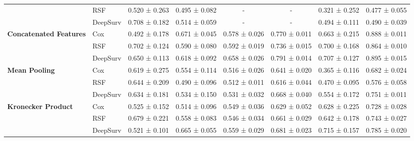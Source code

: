 \begin{sidewaystable}[htbp]
\begin{tabular}{@{}llcccccc@{}}
        & RSF & 0.520 ± 0.263 & 0.495 ± 0.082 & - & - & 0.321 ± 0.252 & 0.477 ± 0.055 \\
        & DeepSurv & 0.708 ± 0.182 & 0.514 ± 0.059 & - & - & 0.494 ± 0.111 & 0.490 ± 0.039 \\
        \midrule
        \multirow{3}{*}{\textbf{Concatenated Features}} & Cox & 0.492 ± 0.178 & 0.671 ± 0.045 & 0.578 ± 0.026 & 0.770 ± 0.011 & 0.663 ± 0.215 & 0.888 ± 0.011 \\
        & RSF & 0.702 ± 0.124 & 0.590 ± 0.080 & 0.592 ± 0.019 & 0.736 ± 0.015 & 0.700 ± 0.168 & 0.864 ± 0.010 \\
        & DeepSurv & 0.650 ± 0.113 & 0.618 ± 0.092 & 0.658 ± 0.026 & 0.791 ± 0.014 & 0.707 ± 0.127 & 0.895 ± 0.015 \\
        \midrule
        \multirow{3}{*}{\textbf{Mean Pooling}} & Cox & 0.619 ± 0.275 & 0.554 ± 0.114 & 0.516 ± 0.026 & 0.641 ± 0.020 & 0.365 ± 0.116 & 0.682 ± 0.024 \\
        & RSF & 0.644 ± 0.209 & 0.490 ± 0.096 & 0.512 ± 0.011 & 0.616 ± 0.044 & 0.470 ± 0.095 & 0.576 ± 0.058 \\
        & DeepSurv & 0.634 ± 0.181 & 0.534 ± 0.150 & 0.531 ± 0.032 & 0.668 ± 0.040 & 0.554 ± 0.172 & 0.751 ± 0.011 \\
        \midrule
        \multirow{3}{*}{\textbf{Kronecker Product}} & Cox & 0.525 ± 0.152 & 0.514 ± 0.096 & 0.549 ± 0.036 & 0.629 ± 0.052 & 0.628 ± 0.225 & 0.728 ± 0.028 \\
        & RSF & 0.679 ± 0.221 & 0.558 ± 0.083 & 0.546 ± 0.034 & 0.661 ± 0.029 & 0.642 ± 0.178 & 0.743 ± 0.027 \\
        & DeepSurv & 0.521 ± 0.101 & 0.665 ± 0.055 & 0.559 ± 0.029 & 0.681 ± 0.023 & 0.715 ± 0.157 & 0.785 ± 0.020 \\
        \bottomrule
    \end{tabular}
\end{sidewaystable}